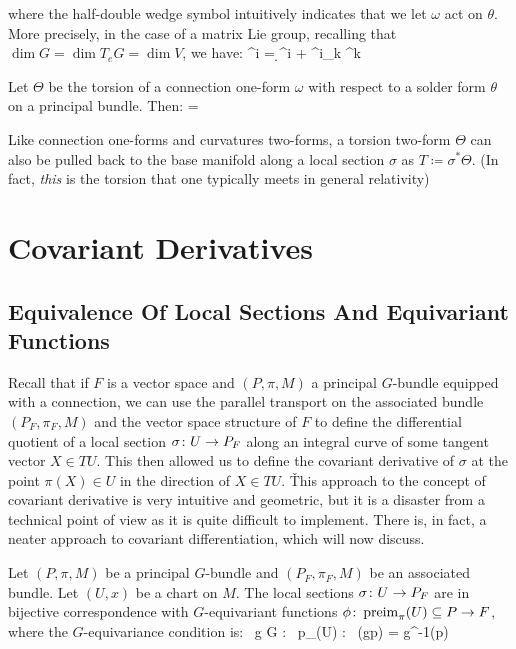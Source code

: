 where the half-double wedge symbol intuitively indicates that we let $\omega$ act on $\theta$. More precisely, in the
case of a matrix Lie group, recalling that $\dim G = \dim T_e G = \dim V$, we have:
\bse
\Theta^i = \d \theta^i + \omega^i_{\phantom{i}k} \halfWedge \theta^k
\ese

Let $\Theta$ be the torsion of a connection one-form $\omega$ with respect to a solder form $\theta$ on a principal
bundle. Then:
\bse
\D \Theta = \Omega \halfWedge \theta
\ese
\et

Like connection one-forms and curvatures two-forms, a torsion two-form $\Theta$ can also be pulled back to the base
manifold along a local section $\sigma$ as $T \coloneqq \sigma^*\Theta$. (In fact, \emph{this} is the torsion that
one typically meets in general relativity)

\section{Covariant Derivatives}

\subsection{Equivalence Of Local Sections And Equivariant Functions}

Recall that if $F$ is a vector space and $(P,\pi,M)$ a principal $G$-bundle equipped with a connection, we can use
the parallel transport on the associated bundle $(P_F,\pi_F,M)$ and the vector space structure of $F$ to define the
differential quotient of a local section $\sigma \colon U\to P_F$ along an integral curve of some tangent vector $X\in
TU$. This then allowed us to define the covariant derivative of $\sigma$ at the point $\pi(X)\in U$ in the direction
of $X\in TU$. \v

This approach to the concept of covariant derivative is very intuitive and geometric, but it is a disaster from a
technical point of view as it is quite difficult to implement. There is, in fact, a neater approach to covariant
differentiation, which will now discuss.

\bt[]
Let $(P,\pi,M)$ be a principal $G$-bundle and $(P_F,\pi_F,M)$ be an associated bundle. Let $(U,x)$ be a chart on $M$.
The local sections $\sigma\colon U \to P_F$ are in bijective correspondence with $G$-equivariant functions
$\phi\colon\operatorname{preim}_{\pi}(U)\subseteq P \to F$, where the $G$-equivariance condition is:
\bse
\forall \, g \in G : \forall \, p\in \preim_{\pi}(U) : \ \phi(g\racts p) = g^{-1}\lacts \phi(p)
\ese
\et

